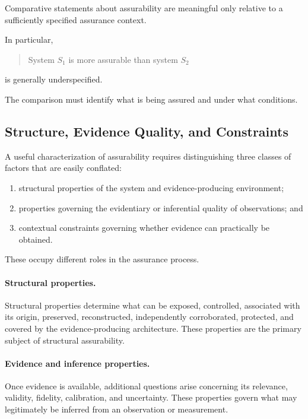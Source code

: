 Comparative statements about assurability are meaningful only relative
to a sufficiently specified assurance context.

In particular,

\begin{quote}
  System \(S_1\) is more assurable than system \(S_2\)
\end{quote}

is generally underspecified.

The comparison must identify what is being assured and under what conditions.

\subsection{Structure, Evidence Quality, and Constraints}
\label{aa.subsec.three-layers}

A useful characterization of assurability requires distinguishing
three classes of factors that are easily conflated:

\begin{enumerate}
  \item structural properties of the system and evidence-producing environment;
  \item properties governing the evidentiary or inferential quality of observations; and
  \item contextual constraints governing whether evidence can practically be obtained.
\end{enumerate}

These occupy different roles in the assurance process.

\paragraph{Structural properties.}
Structural properties determine what can be exposed, controlled,
associated with its origin, preserved, reconstructed, independently
corroborated, protected, and covered by the evidence-producing architecture.
These properties are the primary subject of structural assurability.

\paragraph{Evidence and inference properties.}
Once evidence is available, additional questions arise concerning its
relevance, validity, fidelity, calibration, and uncertainty.
These properties govern what may legitimately be inferred from an
observation or measurement.

